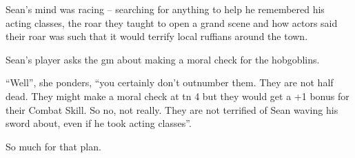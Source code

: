 
\begin{exampletext}

Sean's mind was racing -- searching for anything to help he remembered his acting classes, the roar they taught to open a grand scene and how actors said their roar was such that it would terrify local ruffians around the town.

Sean's player asks the \gls{gm} about making a moral check for the hobgoblins.

``Well'', she ponders, ``you certainly don't outnumber them.
They are not half dead.
They might make a moral check at \gls{tn} 4 but they would get a +1 bonus for their Combat Skill.
So no, not really.
They are not terrified of Sean waving his sword about, even if he took acting classes''.

So much for that plan.

\end{exampletext}
